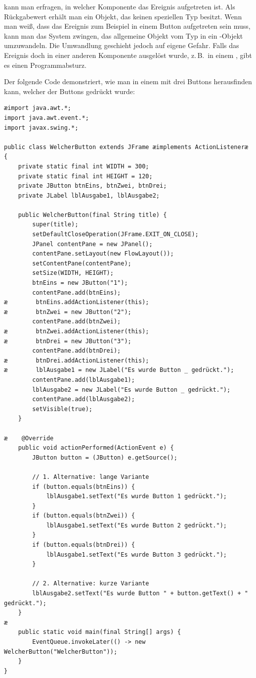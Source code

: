 kann man erfragen, in welcher Komponente das Ereignis aufgetreten ist. Als
Rückgabewert erhält man ein Objekt, das keinen speziellen Typ besitzt. Wenn
man weiß, dass das Ereignis zum Beispiel in einem Button aufgetreten sein muss,
kann man das System zwingen, das allgemeine Objekt vom Typ  in
ein -Objekt umzuwandeln. Die Umwandlung geschieht jedoch \glqq auf
eigene Gefahr\grqq . Falls das Ereignis doch in einer anderen Komponente ausgelöst
wurde, z.\,B.\ in einem , gibt es einen Programmabsturz.

Der folgende Code demonstriert, wie man in einem  mit drei
Buttons herausfinden kann, welcher der Buttons gedrückt wurde:

\begin{lstlisting}
æimport java.awt.*;
import java.awt.event.*;
import javax.swing.*;

public class WelcherButton extends JFrame æimplements ActionListeneræ {
    private static final int WIDTH = 300;
    private static final int HEIGHT = 120;
    private JButton btnEins, btnZwei, btnDrei;
    private JLabel lblAusgabe1, lblAusgabe2;

    public WelcherButton(final String title) {
        super(title);
        setDefaultCloseOperation(JFrame.EXIT_ON_CLOSE);
        JPanel contentPane = new JPanel();
        contentPane.setLayout(new FlowLayout());
        setContentPane(contentPane);
        setSize(WIDTH, HEIGHT);
        btnEins = new JButton("1");
        contentPane.add(btnEins);
æ        btnEins.addActionListener(this);
æ        btnZwei = new JButton("2");
        contentPane.add(btnZwei);
æ        btnZwei.addActionListener(this);
æ        btnDrei = new JButton("3");
        contentPane.add(btnDrei);
æ        btnDrei.addActionListener(this);
æ        lblAusgabe1 = new JLabel("Es wurde Button _ gedrückt.");
        contentPane.add(lblAusgabe1);
        lblAusgabe2 = new JLabel("Es wurde Button _ gedrückt.");
        contentPane.add(lblAusgabe2);
        setVisible(true);
    }

æ    @Override
    public void actionPerformed(ActionEvent e) {
        JButton button = (JButton) e.getSource();

        // 1. Alternative: lange Variante
        if (button.equals(btnEins)) {
            lblAusgabe1.setText("Es wurde Button 1 gedrückt.");
        }
        if (button.equals(btnZwei)) {
            lblAusgabe1.setText("Es wurde Button 2 gedrückt.");
        }
        if (button.equals(btnDrei)) {
            lblAusgabe1.setText("Es wurde Button 3 gedrückt.");
        }

        // 2. Alternative: kurze Variante
        lblAusgabe2.setText("Es wurde Button " + button.getText() + " gedrückt.");
    }
æ
    public static void main(final String[] args) {
        EventQueue.invokeLater(() -> new WelcherButton("WelcherButton"));
    }
}
\end{lstlisting}


